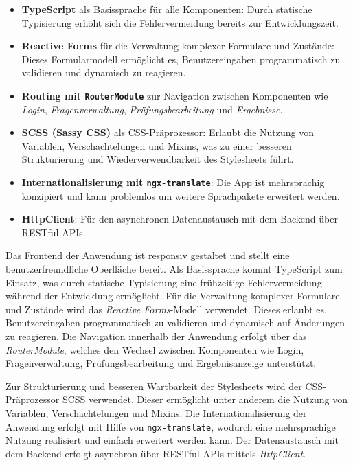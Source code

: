\documentclass[a4paper,12pt]{article}
\begin{document}
\begin{itemize}
    \item \textbf{TypeScript} als Basissprache für alle Komponenten: Durch statische Typisierung erhöht sich die Fehlervermeidung bereits zur Entwicklungszeit.
    
    \item \textbf{Reactive Forms} für die Verwaltung komplexer Formulare und Zustände: Dieses Formularmodell ermöglicht es, Benutzereingaben programmatisch zu validieren und dynamisch zu reagieren.
    
    \item \textbf{Routing mit \texttt{RouterModule}} zur Navigation zwischen Komponenten wie \textit{Login}, \textit{Fragenverwaltung}, \textit{Prüfungsbearbeitung} und \textit{Ergebnisse}.
    
    \item \textbf{SCSS (Sassy CSS)} als CSS-Präprozessor: Erlaubt die Nutzung von Variablen, Verschachtelungen und Mixins, was zu einer besseren Strukturierung und Wiederverwendbarkeit des Stylesheets führt.
    
    \item \textbf{Internationalisierung mit \texttt{ngx-translate}}: Die App ist mehrsprachig konzipiert und kann problemlos um weitere Sprachpakete erweitert werden.
    
    \item \textbf{HttpClient}: Für den asynchronen Datenaustausch mit dem Backend über RESTful APIs.
\end{itemize}

Das Frontend der Anwendung ist responsiv gestaltet und stellt eine benutzerfreundliche Oberfläche bereit. Als Basissprache kommt TypeScript zum Einsatz, was durch statische Typisierung eine frühzeitige Fehlervermeidung während der Entwicklung ermöglicht. Für die Verwaltung komplexer Formulare und Zustände wird das \textit{Reactive Forms}-Modell verwendet. Dieses erlaubt es, Benutzereingaben programmatisch zu validieren und dynamisch auf Änderungen zu reagieren. Die Navigation innerhalb der Anwendung erfolgt über das \textit{RouterModule}, welches den Wechsel zwischen Komponenten wie Login, Fragenverwaltung, Prüfungsbearbeitung und Ergebnisanzeige unterstützt.

Zur Strukturierung und besseren Wartbarkeit der Stylesheets wird der CSS-Präprozessor SCSS verwendet. Dieser ermöglicht unter anderem die Nutzung von Variablen, Verschachtelungen und Mixins. Die Internationalisierung der Anwendung erfolgt mit Hilfe von \texttt{ngx-translate}, wodurch eine mehrsprachige Nutzung realisiert und einfach erweitert werden kann. Der Datenaustausch mit dem Backend erfolgt asynchron über RESTful APIs mittels \textit{HttpClient}.
\end{document}
